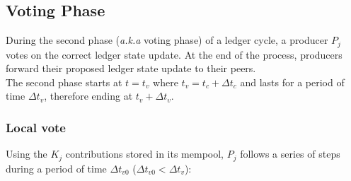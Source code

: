 
\subsection{Voting Phase}

During the second phase (\textit{a.k.a} voting phase) of a ledger cycle, a producer $P_j$ votes on the correct ledger state update. At the end of the process, producers forward their proposed ledger state update to their peers. \\

The second phase starts at $t = t_v$ where $t_v = t_c + \Delta t_{c}$ and lasts for a period of time $\Delta t_{v}$, therefore ending at $t_v+\Delta t_{v}$.

\subsubsection{Local vote}
\label{subs:lv}
Using the $K_j$ contributions stored in its mempool, $P_j$ follows a series of steps during a period of time $\Delta t_{v0}$ ($\Delta t_{v0} < \Delta t_{v}$):
